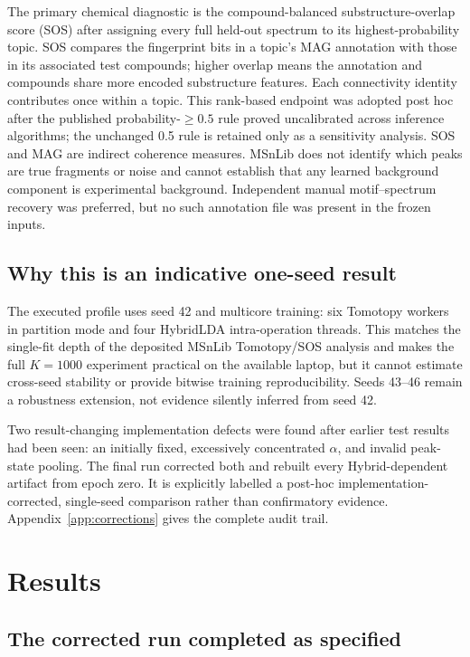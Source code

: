 \documentclass[11pt]{article}
\begin{document}
The primary chemical diagnostic is the compound-balanced substructure-overlap
score (SOS) after assigning every full held-out spectrum to its
highest-probability topic. SOS compares the fingerprint bits in a topic's MAG
annotation with those in its associated test compounds; higher overlap means
the annotation and compounds share more encoded substructure features. Each
connectivity identity contributes once within a topic. This rank-based endpoint
was adopted post hoc after the published probability-$\geq0.5$ rule proved
uncalibrated across inference algorithms; the unchanged 0.5 rule is retained
only as a sensitivity analysis. SOS and MAG are indirect coherence measures.
MSnLib does not identify which peaks are true fragments or noise and cannot
establish that any learned background component is experimental background.
Independent manual motif--spectrum recovery was preferred, but no such
annotation file was present in the frozen inputs.

\subsection{Why this is an indicative one-seed result}

The executed profile uses seed 42 and multicore training: six Tomotopy workers
in partition mode and four HybridLDA intra-operation threads. This matches the
single-fit depth of the deposited MSnLib Tomotopy/SOS analysis and makes the
full $K=1000$ experiment practical on the available laptop, but it cannot
estimate cross-seed stability or provide bitwise training reproducibility.
Seeds 43--46 remain a robustness extension, not evidence silently inferred
from seed 42.

Two result-changing implementation defects were found after earlier test
results had been seen: an initially fixed, excessively concentrated
$\alpha$, and invalid peak-state pooling. The final run corrected both and
rebuilt every Hybrid-dependent artifact from epoch zero. It is explicitly
labelled a post-hoc implementation-corrected, single-seed comparison rather
than confirmatory evidence. Appendix~\ref{app:corrections} gives the complete
audit trail.

\section{Results}

\subsection{The corrected run completed as specified}
\end{document}
